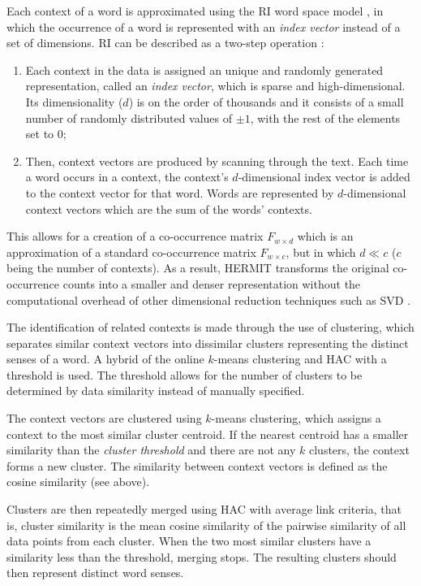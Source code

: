 Each context of a word is approximated using the \ac{RI} word space model
\citep{kanerva2000random}, in which the occurrence of a word is represented with
an \textit{index vector} instead of a set of dimensions. \ac{RI} can be 
described as a two-step operation \citep{sahlgren2005introduction}:

\begin{enumerate}
 \item Each context in the data is assigned an unique and randomly generated
 representation, called an \textit{index vector}, which is sparse and
 high-dimensional. Its dimensionality ($d$) is on the order of thousands and
 it consists of a small number of randomly distributed values of $\pm1$, with 
 the rest of the elements set to $0$;
 \item Then, context vectors are produced by scanning through the text. Each
 time a word occurs in a context, the context's $d$-dimensional index vector is
 added to the context vector for that word. Words are represented by
 $d$-dimensional context vectors which are the sum of the words' contexts.
\end{enumerate}

This allows for a creation of a co-occurrence matrix $F_{w \times d}$ which is
an approximation of a standard co-occurrence matrix $F_{w \times c}$, but in
which $d \ll c$  ($c$ being the number of contexts). As a result, HERMIT
transforms the original co-occurrence counts into a smaller and denser
representation without the computational overhead of other dimensional reduction techniques such as \ac{SVD} \citep{jurgens2010hermit}.

The identification of related contexts is made through the use of clustering, 
which separates similar context vectors into dissimilar clusters representing 
the distinct senses of a word. A hybrid of the online $k$-means clustering 
\citep{liberty2016algorithm} and \ac{HAC} \citep{zepeda2013hierarchical} with a
threshold is used. The threshold allows for the number of clusters to be 
determined by data similarity instead of manually specified.

The context vectors are clustered using $k$-means clustering, which assigns a 
context to the most similar cluster centroid. If the nearest centroid has a 
smaller similarity than the \textit{cluster threshold} and there are not any 
$k$ clusters, the context forms a new cluster. The similarity between context 
vectors is defined as the cosine similarity (see above).

Clusters are then repeatedly merged using \ac{HAC} with average link criteria,
that is, cluster similarity is the mean cosine similarity of the pairwise
similarity of all data points from each cluster. When the two most similar
clusters have a similarity less than the threshold, merging stops. The resulting
clusters should then represent distinct word senses.

